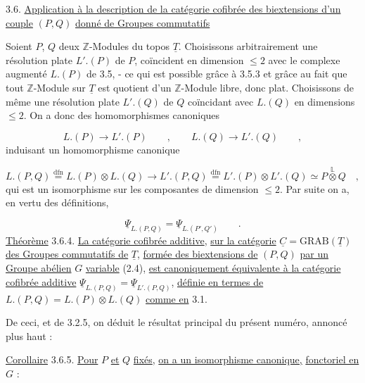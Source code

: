 3.6.  \underline{Application à la description de la catégorie cofibrée des biextensions d'un couple} $(P,Q)$ \underline{donné de Groupes commutatifs}

Soient $P$, $Q$ deux $\mathbb{Z}$-Modules du topos $\underline{T}$. Choisissons arbitrairement une résolution plate $L'.(P)$ de $P$, coïncident en dimension $\leq 2$ avec le complexe augmenté $L.(P)$ de 3.5, - ce qui est possible grâce à 3.5.3 et grâce au fait que tout $\mathbb{Z}$-Module sur $\underline{T}$ est quotient d'un $\mathbb{Z}$-Module libre, donc plat. Choisissons de même une résolution plate $L'.(Q)$ de $Q$ coïncidant avec $L.(Q)$ en dimensions $\leq 2$. On a donc des homomorphismes canoniques

\begin{equation}\tag{3.6.1}
L.(P) \longrightarrow L'.(P) \qquad , \qquad L.(Q) \longrightarrow L'.(Q) \qquad ,
\end{equation}
induisant un homomorphisme canonique

\begin{equation}\tag{3.6.2}
L.(P,Q) \overset{\mathrm{dfn}}{=} L.(P) \otimes L.(Q) \longrightarrow L'.(P,Q) \overset{\mathrm{dfn}}{=} L'.(P) \otimes L'.(Q) \simeq P \overset{\mathbb{L}}{\otimes} Q \quad ,
\end{equation}
qui est un isomorphisme sur les composantes de dimension $\leq 2$. Par suite on a, en vertu des définitions,

\begin{equation}\tag{3.6.3}
\underline{\Psi}_{L.(P,Q)} = \underline{\Psi}_{L.(P',Q')} \qquad .
\end{equation}
\underline{Théorème} 3.6.4. \underline{La catégorie cofibrée additive}, \underline{sur la catégorie} $\underline{C} = \mathrm{GRAB}(\underline{T})$ \underline{des Groupes commutatifs de} $\underline{T}$, \underline{formée des biextensions de} $(P,Q)$ \underline{par un Groupe abélien} $G$ \underline{variable} (2.4), \underline{est canoniquement équivalente à la catégorie cofibrée additive} $\underline{\Psi}_{L.(P,Q)} = \underline{\Psi}_{L'.(P,Q)}$, \underline{définie en termes de} $L.(P,Q) = L.(P) \otimes L.(Q)$ \underline{comme en} 3.1.

De ceci, et de 3.2.5, on déduit le résultat principal du présent numéro, annoncé plus haut :



\underline{Corollaire} 3.6.5. \underline{Pour} $P$ \underline{et} $Q$ \underline{fixés}, \underline{on a un isomorphisme canonique,} \underline{fonctoriel en} $G$ :

